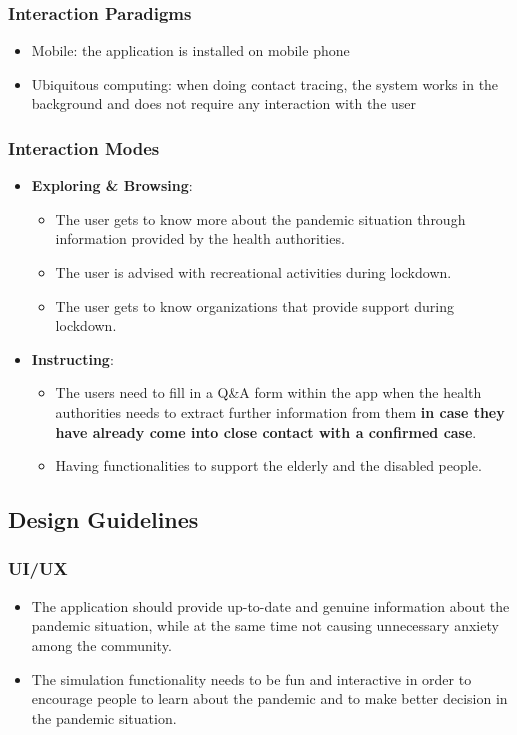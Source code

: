     \subsubsection{Interaction Paradigms}
      \begin{itemize}
        \item Mobile: the application is installed on mobile phone
        \item Ubiquitous computing: when doing contact tracing, the system works in the background and does not require any interaction with the user
      \end{itemize}

    \subsubsection{Interaction Modes}
      \begin{itemize}
        \item \textbf{Exploring \& Browsing}:
          \begin{itemize}
            \item The user gets to know more about the pandemic situation through information provided by the health authorities.
            \item The user is advised with recreational activities during lockdown.
            \item The user gets to know organizations that provide support during lockdown. 
          \end{itemize}
        \item \textbf{Instructing}:
          \begin{itemize}
            \item The users need to fill in a Q\&A form within the app when the health authorities needs to extract further information from them \textbf{in case they have already come into close contact with a confirmed case}.
            \item Having functionalities to support the elderly and the disabled people.
          \end{itemize}
      \end{itemize}
    
  \subsection{Design Guidelines}
    \subsubsection{UI/UX}
      \begin{itemize}
        \item The application should provide up-to-date and genuine information about the pandemic situation, while at the same time not causing unnecessary anxiety among the community.
        \item The simulation functionality needs to be fun and interactive in order to encourage people to learn about the pandemic and to make better decision in the pandemic situation.
      \end{itemize}

